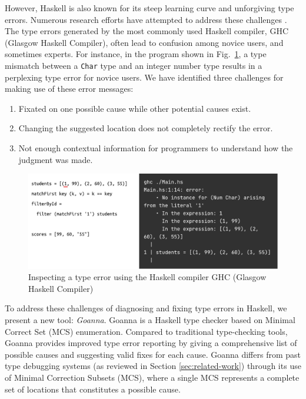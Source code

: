 However, Haskell is also known for its steep learning curve and unforgiving type errors. Numerous research efforts have attempted to address these challenges \cite{Tirronen2015-nr,Chen2014-dz, Heeren2003-kd,Zhang2015-xy, Lerner2007-mu,Zhang2017-tj}. The type errors generated by the most commonly used Haskell compiler, GHC (Glasgow Haskell Compiler), often lead to confusion among novice users, and sometimes experts. For instance, in the program shown in Fig.~\ref{fig:motivation}, a type mismatch between a {\tt Char} type and an integer number type results in a perplexing type error for novice users. We have identified three challenges for making use of these error messages:


    \begin{enumerate}
        \item Fixated on one possible cause while other potential causes exist.
        \item Changing the suggested location does not completely rectify the error.
        \item Not enough contextual information for programmers to understand how the judgment was made.

    \end{enumerate}


    \begin{figure}
        \centering
        \includegraphics[width=\linewidth]{images/motivation}
        \caption{Inspecting a type error using the Haskell compiler GHC (Glasgow Haskell Compiler)}
        \label{fig:motivation}
    \end{figure}




    To address these challenges of diagnosing and fixing type errors in Haskell, we present a new tool: \textit{Goanna}. Goanna is a Haskell type checker based on Minimal Correct Set (MCS) enumeration. Compared to traditional type-checking tools, Goanna provides improved type error reporting by giving a comprehensive list of possible causes and suggesting valid fixes for each cause.  Goanna differs from past type debugging systems (as reviewed in Section \ref{sec:related-work}) through its use of Minimal Correction Subsets (MCS), where a single MCS represents a complete set of locations that constitutes a possible cause.

